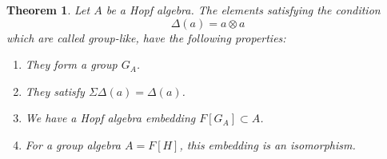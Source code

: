 \documentclass[12pt]{amsbook}
\newtheorem{theorem}{Theorem}[chapter]
\begin{document}

\begin{theorem}
Let $A$ be a Hopf algebra. The elements satisfying the condition
$$\Delta(a)=a\otimes a$$
which are called group-like, have the following properties:
\begin{enumerate}
\item They form a group $G_A$.

\item They satisfy $\Sigma\Delta(a)=\Delta(a)$.

\item We have a Hopf algebra embedding $F[G_A]\subset A$.

\item For a group algebra $A=F[H]$, this embedding is an isomorphism.
\end{enumerate}
\end{theorem}
\end{document}
